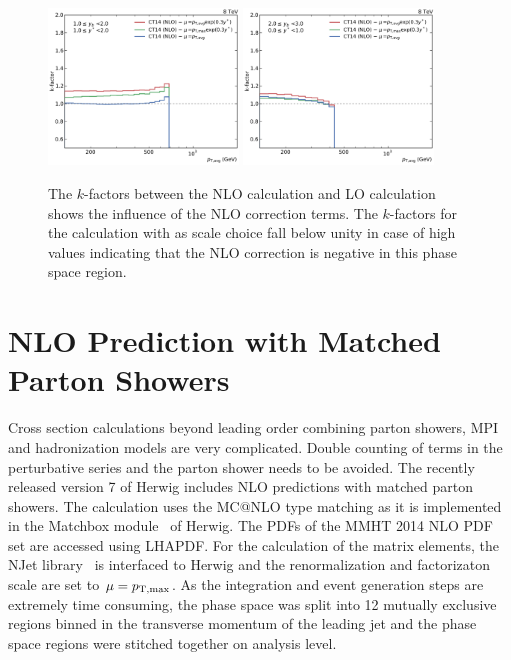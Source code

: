 \begin{figure}[htp]
    \includegraphics[width=0.45\textwidth]{figures/theory/kfactor_comp_yb1ys1.pdf}\hfill
    \includegraphics[width=0.45\textwidth]{figures/theory/kfactor_comp_yb2ys0.pdf}
    \caption[NLO $k$-factors of fastNLO calculation]{The $k$-factors between the NLO calculation and LO calculation
        shows the influence of the NLO correction terms. The $k$-factors for the
        calculation with \ptavg as scale choice fall below unity in case of high
        \ystar values indicating that the NLO correction is negative in this
        phase space region.}
    \label{fig:kfactor_comp}
\end{figure}

\section{NLO Prediction with Matched Parton Showers}

Cross section calculations beyond leading order combining parton showers, MPI
and hadronization models are very complicated. Double counting of terms in the
perturbative series and the parton shower needs to be avoided. The recently
released version 7 of Herwig includes NLO predictions with matched parton
showers.  The calculation uses the MC@NLO type matching as it is implemented in
the Matchbox module~\cite{Platzer:2011bc} of Herwig. The PDFs of the MMHT 2014
NLO PDF set are accessed using LHAPDF. For the calculation of the matrix
elements, the NJet library~\cite{Badger:2012pg} is interfaced to Herwig and the
renormalization and factorizaton scale are set to $\mu = p_{\mathrm{T,max}}$. As the
integration and event generation steps are extremely time consuming, the phase
space was split into 12 mutually exclusive regions binned in the transverse
momentum of the leading jet and the phase space regions were stitched together
on analysis level.

